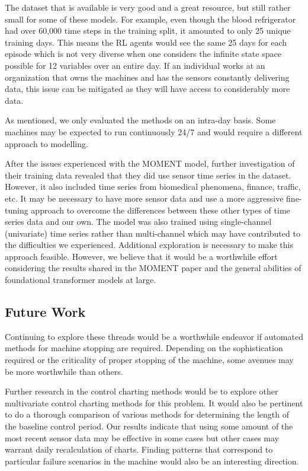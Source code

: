 \documentclass[12pt]{article}
\begin{document}
The dataset that is available is very good and a great resource, but still rather small for some of these models. For example, even though the blood refrigerator had over 60,000 time steps in the training split,
it amounted to only 25 unique training days. This means the RL agents would see the same 25 days for each episode which is not very diverse when one considers the infinite state space
possible for 12 variables over an entire day. If an individual works at an organization that owns the machines and has the sensors constantly delivering data, this issue can be mitigated
as they will have access to considerably more data.

As mentioned, we only evaluated the methods on an intra-day basis. Some machines may be expected to run continuously 24/7 and would require a different approach to modelling.

After the issues experienced with the MOMENT model, further investigation of their training data revealed that they did use sensor time series in the dataset. However, it also included
time series from biomedical phenomena, finance, traffic, etc. It may be necessary to have more sensor data and use a more aggressive fine-tuning approach to overcome the differences
between these other types of time series data and our own. The model was also trained using single-channel (univariate) time series rather than multi-channel which may have contributed
to the difficulties we experienced. Additional exploration is necessary to make this approach feasible. However, we believe that it would be a worthwhile effort considering the results
shared in the MOMENT paper and the general abilities of foundational transformer models at large.

\subsection{Future Work}
Continuing to explore these threads would be a worthwhile endeavor if automated methods for machine stopping are required. Depending on the sophistication required or the criticality
of proper stopping of the machine, some avenues may be more worthwhile than others.

Further research in the control charting methods would be to explore other multivariate control charting methods for this problem. It would also be pertinent to do a thorough comparison
of various methods for determining the length of the baseline control period. Our results indicate that using some amount of the most recent sensor data may be effective in some cases
but other cases may warrant daily recalculation of charts. Finding patterns that correspond to particular failure scenarios in the machine would also be an interesting direction.
\end{document}

